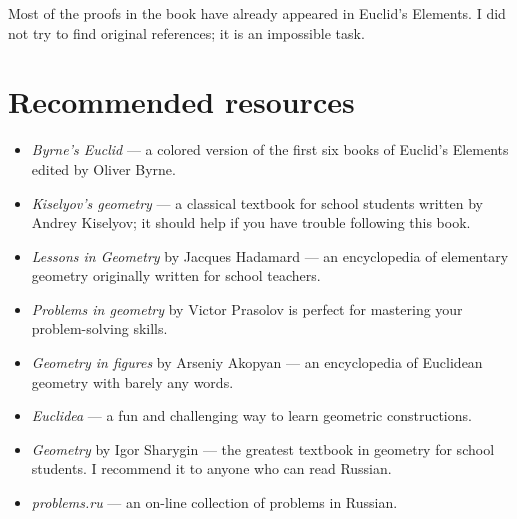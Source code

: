 Most of the proofs in the book have already appeared in Euclid's Elements.
I did not try to find original references; it is an impossible task.

\section{Recommended resources}

\begin{itemize}
\item {}\emph{Byrne's Euclid} \cite{byrne} --- a colored version of the first six books of Euclid's Elements edited by Oliver Byrne. 

\item {}\emph{Kiselyov's geometry} \cite{kiselev} ---
a classical textbook for school students written by Andrey Kiselyov; it should help if you have trouble following this book.

\item {}\emph{Lessons in Geometry} by Jacques Hadamard \cite{hadamard} --- an encyclopedia of elementary geometry originally written for school teachers.



\item {}\emph{Problems in geometry} by Victor Prasolov \cite{prasolov} is perfect for mastering your problem-solving skills.

\item {}\emph{Geometry in figures} by Arseniy Akopyan \cite{akopyan} --- an encyclopedia of Euclidean geometry with barely any words.

\item {}\emph{Euclidea} \cite{euclidea} --- a fun and challenging way to learn geometric constructions.
 
\item {}\emph{Geometry} by Igor Sharygin \cite{sharygin} --- the greatest textbook in geometry for school students.
I recommend it to anyone who can read Russian.

\item {}\emph{problems.ru} \cite{zadachi} --- an on-line collection of problems in Russian.

\end{itemize}

